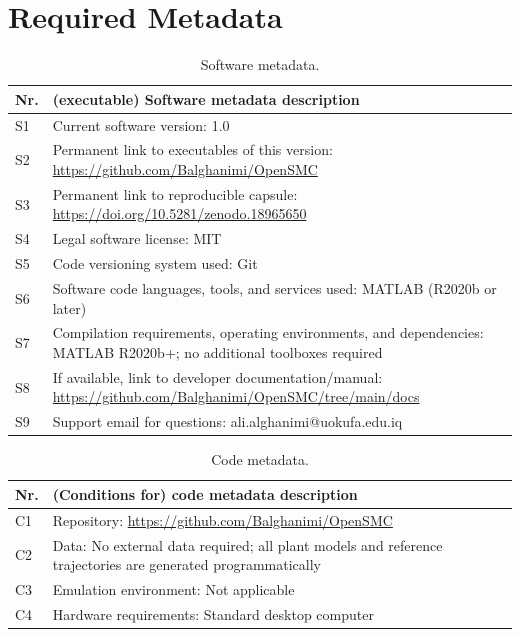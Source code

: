 \documentclass[preprint,12pt]{elsarticle}
\begin{document}
\section*{Required Metadata}

\begin{table}[h!]
\small
\begin{tabularx}{\textwidth}{|l|X|}
\hline
\textbf{Nr.} & \textbf{(executable) Software metadata description} \\
\hline
S1 & Current software version: 1.0 \\
\hline
S2 & Permanent link to executables of this version: \url{https://github.com/Balghanimi/OpenSMC} \\
\hline
S3 & Permanent link to reproducible capsule: \url{https://doi.org/10.5281/zenodo.18965650} \\
\hline
S4 & Legal software license: MIT \\
\hline
S5 & Code versioning system used: Git \\
\hline
S6 & Software code languages, tools, and services used: MATLAB (R2020b or later) \\
\hline
S7 & Compilation requirements, operating environments, and dependencies: MATLAB R2020b+; no additional toolboxes required \\
\hline
S8 & If available, link to developer documentation/manual: \url{https://github.com/Balghanimi/OpenSMC/tree/main/docs} \\
\hline
S9 & Support email for questions: ali.alghanimi@uokufa.edu.iq \\
\hline
\end{tabularx}
\caption{Software metadata.}
\label{tab:metadata}
\end{table}

\begin{table}[h!]
\small
\begin{tabularx}{\textwidth}{|l|X|}
\hline
\textbf{Nr.} & \textbf{(Conditions for) code metadata description} \\
\hline
C1 & Repository: \url{https://github.com/Balghanimi/OpenSMC} \\
\hline
C2 & Data: No external data required; all plant models and reference trajectories are generated programmatically \\
\hline
C3 & Emulation environment: Not applicable \\
\hline
C4 & Hardware requirements: Standard desktop computer \\
\hline
\end{tabularx}
\caption{Code metadata.}
\label{tab:code_metadata}
\end{table}
\end{document}

